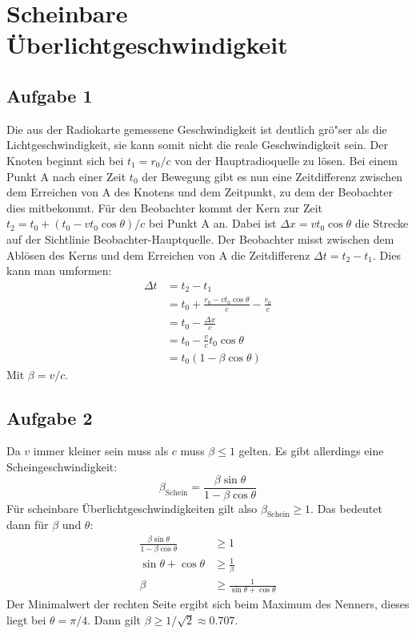 \documentclass[12pt]{article}
\begin{document}
\section{Scheinbare \"{U}berlichtgeschwindigkeit}

\subsection{Aufgabe 1}

Die aus der Radiokarte gemessene Geschwindigkeit ist deutlich gr\"{o}"ser als die Lichtgeschwindigkeit, sie kann somit nicht die reale Geschwindigkeit sein. 
Der Knoten beginnt sich bei $t_1=r_0/c$ von der Hauptradioquelle zu l\"{o}sen. Bei einem Punkt A nach einer Zeit $t_0$ der Bewegung gibt es nun eine Zeitdifferenz zwischen dem Erreichen von A des Knotens und dem Zeitpunkt, zu dem der Beobachter dies mitbekommt. F\"{u}r den Beobachter kommt der Kern zur Zeit $t_2=t_0+(t_0-vt_0\cos \theta)/c$ bei Punkt A an. Dabei ist $\Delta x = vt_0\cos \theta$ die Strecke auf der Sichtlinie Beobachter-Hauptquelle. Der Beobachter misst zwischen dem Abl\"{o}sen des Kerns und dem Erreichen von A die Zeitdifferenz $\Delta t = t_2 - t_1$. Dies kann man umformen:
\begin{align*}
	\Delta t &= t_2 - t_1 \\
	         &= t_0+\frac{r_0-vt_0\cos \theta}{c} - \frac{r_0}{c} \\
	         &= t_0 - \frac{\Delta x}{c} \\
	         &= t_0 - \frac{v}{c} t_0 \cos \theta \\
	         &= t_0 (1-\beta \cos \theta)      
\end{align*}
Mit $\beta = v/c$.

\subsection{Aufgabe 2}

Da $v$ immer kleiner sein muss als $c$ muss $\beta \leq 1$ gelten. Es gibt allerdings eine Scheingeschwindigkeit:
\begin{equation}
	\beta_{\text{Schein}} = \frac{\beta \sin \theta}{1-\beta \cos \theta}
\end{equation}
F\"{u}r scheinbare \"{U}berlichtgeschwindigkeiten gilt also $\beta_{\text{Schein}}\geq 1$. Das bedeutet dann f\"{u}r $\beta$ und $\theta$:
\begin{align*}
	\frac{\beta \sin \theta}{1-\beta \cos \theta} &\geq 1 \\
	\sin \theta + \cos \theta &\geq \frac{1}{\beta} \\
	\beta &\geq \frac{1}{\sin \theta + \cos \theta}
\end{align*}
Der Minimalwert der rechten Seite ergibt sich beim Maximum des Nenners, dieses liegt bei $\theta = \pi / 4$. Dann gilt $\beta\geq 1/\sqrt{2}\approx0.707$.
\end{document}

